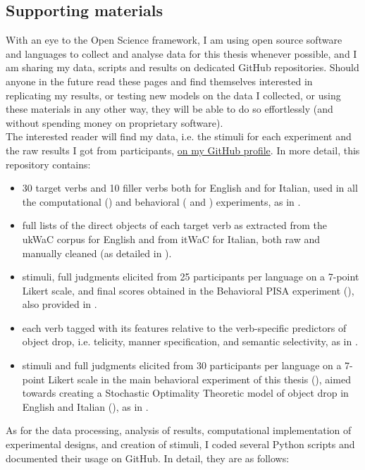 \subsection{Supporting materials}
With an eye to the Open Science framework, I am using open source software and languages to collect and analyse data for this thesis whenever possible, and I am sharing my data, scripts and results on dedicated GitHub repositories. Should anyone in the future read these pages and find themselves interested in replicating my results, or testing new models on the data I collected, or using these materials in any other way, they will be able to do so effortlessly (and without spending money on proprietary software).\\
The interested reader will find my data, i.e. the stimuli for each experiment and the raw results I got from participants, \href{https://github.com/giuliacappelli/dissertationData}{on my GitHub profile}. In more detail, this repository contains:
\begin{itemize}
    \item 30 target verbs and 10 filler verbs both for English and for Italian, used in all the computational () and behavioral ( and ) experiments, as in .
    \item full lists of the direct objects of each target verb as extracted from the ukWaC corpus for English and from itWaC for Italian, both raw and manually cleaned (as detailed in ).
    \item stimuli, full judgments elicited from 25 participants per language on a 7-point Likert scale, and final scores obtained in the Behavioral PISA experiment (), also provided in .
    \item each verb tagged with its features relative to the verb-specific predictors of object drop, i.e. telicity, manner specification, and semantic selectivity, as in .
    \item stimuli and full judgments elicited from 30 participants per language on a 7-point Likert scale in the main behavioral experiment of this thesis (), aimed towards creating a Stochastic Optimality Theoretic model of object drop in English and Italian (), as in .
\end{itemize}
As for the data processing, analysis of results, computational implementation of experimental designs, and creation of stimuli, I coded several Python scripts and documented their usage on GitHub. In detail, they are as follows:
